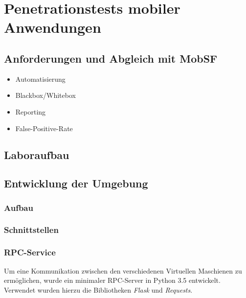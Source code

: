 \chapter{Penetrationstests mobiler Anwendungen}


	


	\section{Anforderungen und Abgleich mit MobSF}
	\begin{itemize}
		\item Automatisierung
		\item Blackbox/Whitebox
		\item Reporting
		\item False-Positive-Rate
	\end{itemize}

		
	\section{Laboraufbau}
	\section{Entwicklung der Umgebung}
		\subsection{Aufbau}
		\subsection{Schnittstellen}
		\subsection{RPC-Service}
Um eine Kommunikation zwischen den verschiedenen Virtuellen Maschienen zu ermöglichen, wurde ein minimaler RPC-Server in Python 3.5 entwickelt. Verwendet wurden hierzu die Bibliotheken \textit{Flask} und \textit{Requests}.

